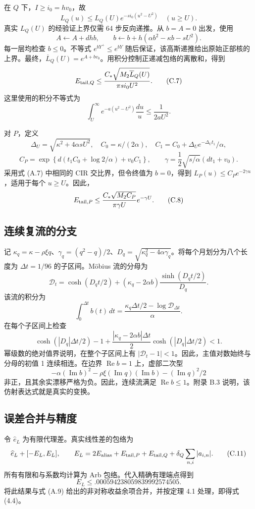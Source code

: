 在 \(Q\) 下，\(I\ge i_0=hv_0\)，故
\[
L_Q(u)\le L_Q(U)e^{-si_0(u^2-U^2)}\quad(u\ge U).
\]
真实 \(L_Q(U)\) 的经验证上界仅需 64 步反向递推。从 \(b=A=0\) 出发，使用
\[
A\leftarrow A+dhb,\qquad
b\leftarrow b+h(\alpha b^2-\kappa b-sU^2).
\tag{C.6}
\]
每一层均检查 \(b\le0\)。不等式 \(e^{bY^+}\le e^{bY}\) 随后保证，该高斯递推给出原始正部核的上界。最终，\(\overline L_Q(U)=e^{A+bv_0}\)。用积分控制正递减包络的离散和，得到
\[
E_{{\rm tail},Q}\le
\frac{C_*\sqrt{M_2\overline L_Q(U)}}{\pi s i_0U^2}.
\tag{C.7}
\]
这里使用的积分不等式为
\[
\int_U^\infty e^{-a(u^2-U^2)}\frac{du}{u}\le\frac1{2aU^2}.
\]

对 \(P\)，定义
\[
\Delta_U=\sqrt{\kappa^2+4\alpha sU^2},\quad
C_0=\kappa/(2\alpha),\quad
C_1=C_0+\Delta_Ue^{-\Delta_Ut_1}/\alpha,
\]
\[
C_P=\exp\!\left\{
d(t_1C_0+\log2/\alpha)+v_0C_1\right\},\qquad
\gamma=\frac12\sqrt{s/\alpha}(dt_1+v_0).
\]
采用式 (A.7) 中相同的 CIR 交比界，但令终值为 \(b=0\)，得到 \(L_P(u)\le C_Pe^{-2\gamma u}\)，适用于每个 \(u\ge U\)。因此，
\[
E_{{\rm tail},P}\le
\frac{C_*\sqrt{M_2C_P}}{\pi\gamma U}e^{-\gamma U}.
\tag{C.8}
\]

\subsection{连续复流的分支}

记 \(\kappa_q=\kappa-\rho\xi q\)、\(\gamma_q=(q^2-q)/2\)、\(D_q=\sqrt{\kappa_q^2-4\alpha\gamma_q}\)。将每个月划分为八个长度为 \(\Delta t=1/96\) 的子区间。M\"obius 流的分母为
\[
\mathcal D_t=\cosh(D_qt/2)
+(\kappa_q-2\alpha b)\frac{\sinh(D_qt/2)}{D_q}.
\]
该流的积分为
\[
\int_0^{\Delta t}b(t)\,dt
=\frac{\kappa_q\Delta t/2-\log\mathcal D_{\Delta t}}{\alpha}.
\tag{C.9}
\]
在每个子区间上检查
\[
\cosh(|D_q|\Delta t/2)-1+
\frac{|\kappa_q-2\alpha b|\Delta t}{2}
\cosh(|D_q|\Delta t/2)<1.
\tag{C.10}
\]
幂级数的绝对值界说明，在整个子区间上有 \(|\mathcal D_t-1|<1\)。因此，主值对数始终与分母的初值 1 连续相连。在边界 \(\operatorname{Re}b=1\) 上，虚部二次型
\[
-\alpha(\operatorname{Im}b)^2
-\rho\xi(\operatorname{Im}q)(\operatorname{Im}b)
-(\operatorname{Im}q)^2/2
\]
非正，且其余实漂移严格为负。因此，连续流满足 \(\operatorname{Re}b\le1\)。附录 B.3 说明，该仿射表达式就是真实的变换。

\subsection{误差合并与精度}

令 \(\widehat e_L\) 为有限代理差。真实线性差的包络为
\[
\widehat e_L+
[-E_L,E_L],\qquad
E_L=2E_{\rm alias}+E_{{\rm tail},P}
+E_{{\rm tail},Q}+\delta_Q\sum_{n,i}|a_{i,n}|.
\tag{C.11}
\]
所有有限和与系数均计算为 Arb 包络。代入精确有理端点得到
\[
E_L\le.000594238059839992574505.
\]
将此结果与式 (A.9) 给出的非对称收益余项合并，并按定理 4.1 处理，即得式 (4.4)。


